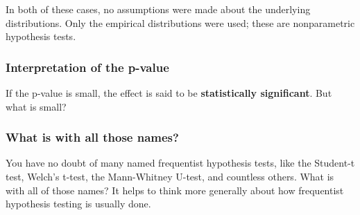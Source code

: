 In both of these cases, no assumptions were made about the underlying distributions. Only the empirical distributions were used; these are nonparametric hypothesis tests.

\subsubsection{Interpretation of the p-value}
If the p-value is small, the effect is said to be \textbf{statistically significant}. But what is small?

\subsubsection{What is with all those names?}
You have no doubt of many named frequentist hypothesis tests, like the Student-t test, Welch's t-test, the Mann-Whitney U-test, and countless others.  What is with all of those names?  It helps to think more generally about how frequentist hypothesis testing is usually done.


